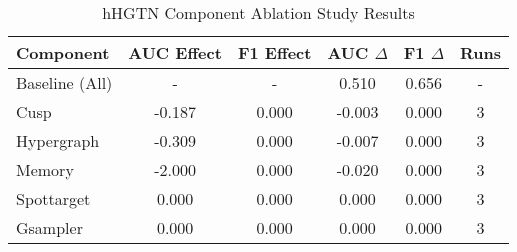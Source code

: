 \begin{table}[h]
\centering
\caption{hHGTN Component Ablation Study Results}
\begin{tabular}{lccccc}
\hline
Component & AUC Effect & F1 Effect & AUC $\Delta$ & F1 $\Delta$ & Runs \\
\hline
Baseline (All) & - & - & 0.510 & 0.656 & - \\
Cusp & -0.187 & 0.000 & -0.003 & 0.000 & 3 \\
Hypergraph & -0.309 & 0.000 & -0.007 & 0.000 & 3 \\
Memory & -2.000 & 0.000 & -0.020 & 0.000 & 3 \\
Spottarget & 0.000 & 0.000 & 0.000 & 0.000 & 3 \\
Gsampler & 0.000 & 0.000 & 0.000 & 0.000 & 3 \\
\hline
\end{tabular}
\end{table}